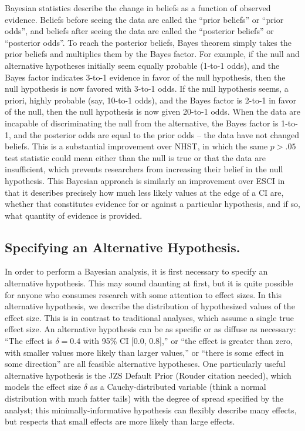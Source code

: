 \documentclass[fignum,nobf,man]{apa}
\begin{document}
Bayesian statistics describe the change in beliefs as a function of observed evidence. Beliefs before seeing the data are called the ``prior beliefs'' or ``prior odds'', and beliefs after seeing the data are called the ``posterior beliefs'' or ``posterior odds''. To reach the posterior beliefs, Bayes theorem simply takes the prior beliefs and multiplies them by the Bayes factor. For example, if the null and alternative hypotheses initially seem equally probable (1-to-1 odds), and the Bayes factor indicates 3-to-1 evidence in favor of the null hypothesis, then the null hypothesis is now favored with 3-to-1 odds. If the null hypothesis seems, a priori, highly probable (say, 10-to-1 odds), and the Bayes factor is 2-to-1 in favor of the null, then the null hypothesis is now given 20-to-1 odds. When the data are incapable of discriminating the null from the alternative, the Bayes factor is 1-to-1, and the posterior odds are equal to the prior odds – the data have not changed beliefs. This is a substantial improvement over NHST, in which the same $p > .05$ test statistic could mean either than the null is true or that the data are insufficient, which prevents researchers from increasing their belief in the null hypothesis. This Bayesian approach is similarly an improvement over ESCI in that it describes precisely how much less likely values at the edge of a CI are, whether that constitutes evidence for or against a particular hypothesis, and if so, what quantity of evidence is provided. 

\subsection{Specifying an Alternative Hypothesis.  }
In order to perform a Bayesian analysis, it is first necessary to specify an alternative hypothesis. This may sound daunting at first, but it is quite possible for anyone who consumes research with some attention to effect sizes. In this alternative hypothesis, we describe the distribution of hypothesized values of the effect size. This is in contrast to traditional analyses, which assume a single true effect size. An alternative hypothesis can be as specific or as diffuse as necessary: ``The effect is $\delta = 0.4$ with 95\% CI [0.0, 0.8],'' or ``the effect is greater than zero, with smaller values more likely than larger values,'' or ``there is some effect in some direction'' are all feasible alternative hypotheses. One particularly useful alternative hypothesis is the JZS Default Prior (Rouder citation needed), which models the effect size $\delta$ as a Cauchy-distributed variable (think a normal distribution with much fatter tails) with the degree of spread specified by the analyst; this minimally-informative hypothesis can flexibly describe many effects, but respects that small effects are more likely than large effects.
\end{document}

